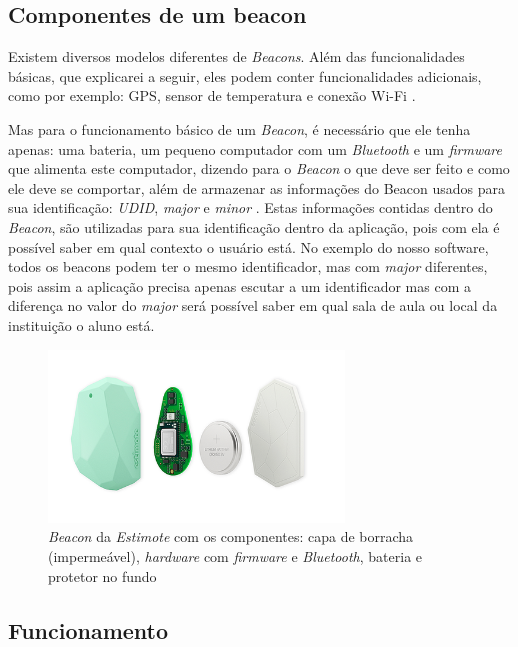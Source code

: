 \documentclass[
	12pt,
	oneside,
	a4paper,
	english,
	brazil,
]{abntex2}
\begin{document}
\subsection{Componentes de um beacon}

Existem diversos modelos diferentes de \emph{Beacons}. Além das funcionalidades básicas, que explicarei a seguir, eles podem conter funcionalidades adicionais, como por exemplo: GPS, sensor de temperatura e conexão Wi-Fi \cite{beacon-sensors-easy-kontakt}.

Mas para o funcionamento básico de um \emph{Beacon}, é necessário que ele tenha apenas: uma bateria, um pequeno computador com um \emph{Bluetooth} e um \emph{firmware} que alimenta este computador, dizendo para o \emph{Beacon} o que deve ser feito e como ele deve se comportar, além de armazenar as informações do Beacon usados para sua identificação: \emph{UDID}, \emph{major} e \emph{minor} \cite{beacon-basic-hardware}. Estas informações contidas dentro do \emph{Beacon}, são utilizadas para sua identificação dentro da aplicação, pois com ela é possível saber em qual contexto o usuário está. No exemplo do nosso software, todos os beacons podem ter o mesmo identificador, mas com \emph{major} diferentes, pois assim a aplicação precisa apenas escutar a um identificador mas com a diferença no valor do \emph{major} será possível saber em qual sala de aula ou local da instituição o aluno está.

\begin{figure}[h]
\centering
\includegraphics[width=0.7\textwidth]{estimote-beacon}
    \caption{
        \emph{Beacon} da \emph{Estimote} com os componentes: capa de borracha (impermeável), \emph{hardware} com \emph{firmware} e \emph{Bluetooth}, bateria e protetor no fundo
    }
\end{figure}

\subsection{Funcionamento}
\end{document}
